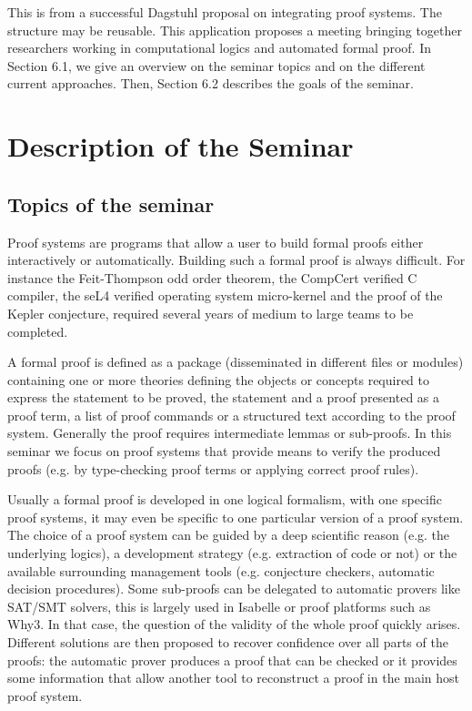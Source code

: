 \begin{oldpart}{This is from a successful Dagstuhl proposal on integrating proof systems. The structure may be reusable.}
This application proposes a meeting bringing together researchers
working in computational logics and automated formal proof.
In Section 6.1, we give an overview on the seminar topics and on the
different current approaches. Then,  Section 6.2 describes the goals of the seminar.

\section{Description of the Seminar}

\subsection{Topics of the seminar}

Proof systems are programs that allow a user to build formal proofs either
interactively or automatically. Building such a formal proof is
always difficult. For instance the Feit-Thompson odd order theorem,
the CompCert verified C compiler, the seL4 verified operating system
micro-kernel and the proof of the Kepler conjecture, required several
years of medium to large teams to be completed. 

A formal proof is defined as a package (disseminated in different
files or modules) containing one or more theories defining the
objects or concepts required to express the statement to be proved,
the statement and a proof presented as a proof term, a list of proof
commands or a structured text according to the proof system. Generally
the proof requires intermediate lemmas or sub-proofs. 
In this seminar we focus on proof systems that provide means to verify
the produced proofs (e.g. by type-checking proof terms or applying
correct proof rules). 

Usually a formal proof is developed in one logical formalism, with
one specific proof systems, it may even be specific to one particular
version of a proof system. The choice of a proof system
can be guided by a deep scientific reason (e.g. the underlying
logics), a development strategy (e.g. extraction of code or not) or
the available surrounding management tools  (e.g. conjecture checkers,
automatic decision procedures). Some sub-proofs can be delegated to
automatic provers like SAT/SMT solvers, this is largely used in
Isabelle or proof platforms such as Why3. In that case, the question
of the validity of the whole proof quickly arises. Different solutions
are then proposed  to recover confidence over all parts of the proofs:
the automatic prover produces a proof that can be checked or it
provides some information that allow another tool to reconstruct a proof in the main host proof system.


\end{oldpart}
